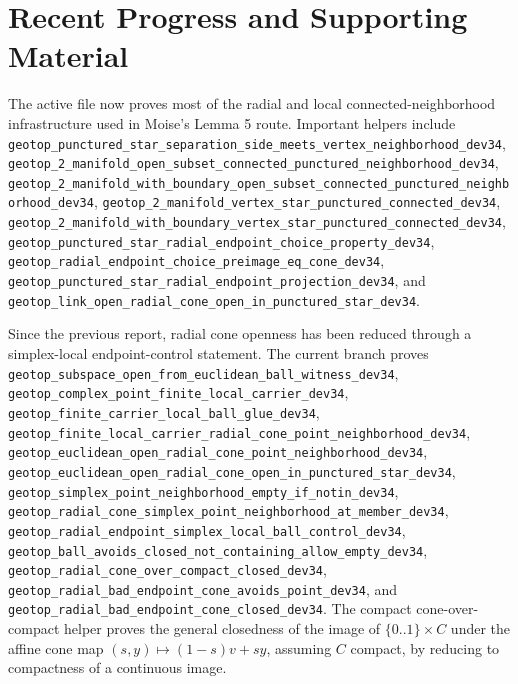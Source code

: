 \documentclass{article}
\begin{document}
\section*{Recent Progress and Supporting Material}

The active file now proves most of the radial and local connected-neighborhood
infrastructure used in Moise's Lemma 5 route. Important helpers include
\texttt{geotop\_punctured\_star\_separation\_side\_meets\_vertex\_neighborhood\_dev34},
\texttt{geotop\_2\_manifold\_open\_subset\_connected\_punctured\_neighborhood\_dev34},
\texttt{geotop\_2\_manifold\_with\_boundary\_open\_subset\_connected\_punctured\_neighborhood\_dev34},
\texttt{geotop\_2\_manifold\_vertex\_star\_punctured\_connected\_dev34},
\texttt{geotop\_2\_manifold\_with\_boundary\_vertex\_star\_punctured\_connected\_dev34},
\texttt{geotop\_punctured\_star\_radial\_endpoint\_choice\_property\_dev34},
\texttt{geotop\_radial\_endpoint\_choice\_preimage\_eq\_cone\_dev34},
\texttt{geotop\_punctured\_star\_radial\_endpoint\_projection\_dev34}, and
\texttt{geotop\_link\_open\_radial\_cone\_open\_in\_punctured\_star\_dev34}.

Since the previous report, radial cone openness has been reduced through a
simplex-local endpoint-control statement. The current branch proves
\texttt{geotop\_subspace\_open\_from\_euclidean\_ball\_witness\_dev34},
\texttt{geotop\_complex\_point\_finite\_local\_carrier\_dev34},
\texttt{geotop\_finite\_carrier\_local\_ball\_glue\_dev34},
\texttt{geotop\_finite\_local\_carrier\_radial\_cone\_point\_neighborhood\_dev34},
\texttt{geotop\_euclidean\_open\_radial\_cone\_point\_neighborhood\_dev34},
\texttt{geotop\_euclidean\_open\_radial\_cone\_open\_in\_punctured\_star\_dev34},
\texttt{geotop\_simplex\_point\_neighborhood\_empty\_if\_notin\_dev34},
\texttt{geotop\_radial\_cone\_simplex\_point\_neighborhood\_at\_member\_dev34},
\texttt{geotop\_radial\_endpoint\_simplex\_local\_ball\_control\_dev34},
\texttt{geotop\_ball\_avoids\_closed\_not\_containing\_allow\_empty\_dev34},
\texttt{geotop\_radial\_cone\_over\_compact\_closed\_dev34},
\texttt{geotop\_radial\_bad\_endpoint\_cone\_avoids\_point\_dev34}, and
\texttt{geotop\_radial\_bad\_endpoint\_cone\_closed\_dev34}.
The compact cone-over-compact helper proves the general closedness of the image
of \(\{0..1\}\times C\) under the affine cone map
\((s,y)\mapsto (1-s)v+s y\), assuming \(C\) compact, by reducing to compactness
of a continuous image.
\end{document}
